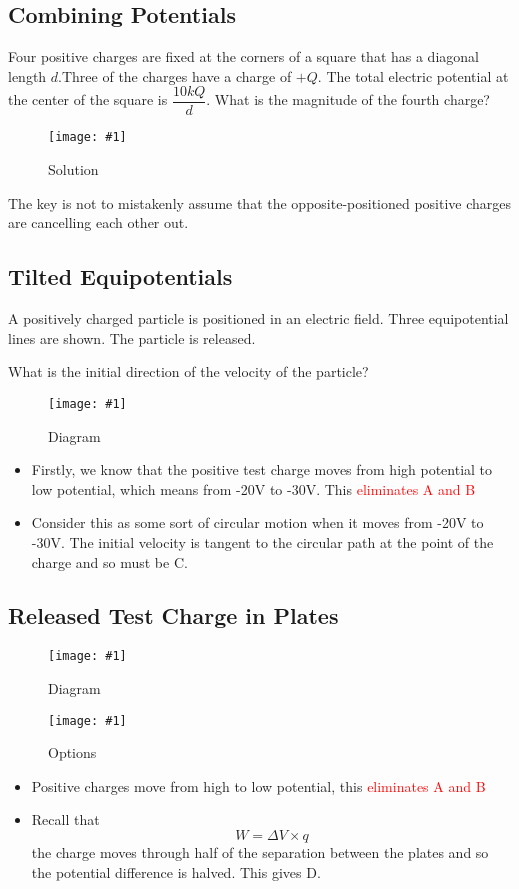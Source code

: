 \documentclass[a4paper,12pt]{article}
\newcommand{\img}[4]{\begin{center}
  \begin{figure}[H]
    \centering
    \texttt{[image: \#1]}
    \caption{#3}
    \label{fig:#4}
  \end{figure}
\end{center}}
\begin{document}
\pagebreak
\subsection{Combining Potentials}

Four positive charges are fixed at the corners of a square that has a diagonal length $d$.Three of the charges have a charge of $+Q$. The total electric potential at the center of the square is $\dfrac{10kQ}{d}$.
What is the magnitude of the fourth charge?

\img{ex/1.jpg}{0.9}{Solution}{1}

The key is not to mistakenly assume that the opposite-positioned positive charges are cancelling each other out.

\pagebreak

\subsection{Tilted Equipotentials}

A positively charged particle is positioned in an electric field. Three equipotential lines are shown. The particle is released.

What is the initial direction of the velocity of the particle?

\img{ex/2.png}{0.4}{Diagram}{ex2}

\begin{itemize}
  \item Firstly, we know that the positive test charge moves from high potential to low potential, which means from -20V to -30V. This \textcolor{red}{eliminates A and B}
  \item Consider this as some sort of circular motion when it moves from -20V to -30V. The initial velocity is tangent to the circular path at the point of the charge and so must be C.
\end{itemize}

\pagebreak

\subsection{Released Test Charge in Plates}

\img{ex/3.png}{0.7}{Diagram}{ex3}

\img{ex/4.png}{0.4}{Options}{ex4}

\begin{itemize}
  \item Positive charges move from high to low potential, this \textcolor{red}{eliminates A and B}
  \item Recall that $$W = \Delta V \times q$$
        the charge moves through half of the separation between the plates and so the potential difference is halved. This gives D.
\end{itemize}
\end{document}
